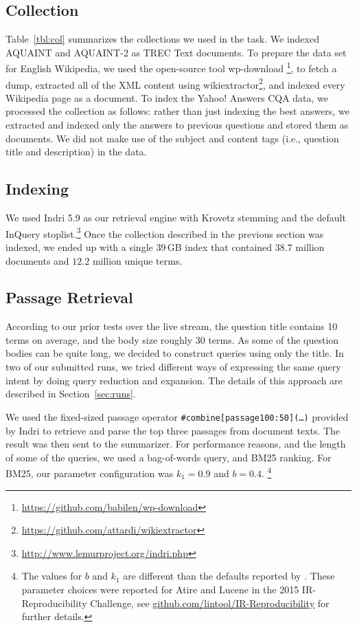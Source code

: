 \documentclass[a4paper,10pt,conference,compsocconf,final]{IEEEtran}
\newcommand\method[1]{{\sf\small{#1}}}
\newcommand\gb[1]{$#1$\,GB}
\begin{document}
{{{{\subsection{Collection}

Table~{\ref{tbl:col}} summarizes the collections we used in the task.  We
indexed AQUAINT and AQUAINT-2 as TREC Text documents.
To prepare the data set for English Wikipedia, we used the
open-source tool {\method{wp-download}}
\footnote{\url{https://github.com/babilen/wp-download}}, to fetch a
dump, extracted all of the XML content using
{\method{wikiextractor}}\footnote{\url{https://github.com/attardi/wikiextractor}},
and indexed every Wikipedia page as a document.
To index the Yahoo! Answers CQA data, we processed the collection as 
follows: rather than just indexing the best answers, we extracted and
indexed only the answers to previous questions and stored them as
documents.
We did not make use of the subject and content tags (i.e., question
title and description) in the data.

\subsection{Indexing}
We used Indri 5.9 as our retrieval engine with Krovetz stemming and
the default InQuery
stoplist.\footnote{\url{http://www.lemurproject.org/indri.php}}
Once the collection described in the previous section was indexed, we 
ended up with a single \gb{39} index that contained $38.7$
million documents and $12.2$ million unique terms.

\subsection{Passage Retrieval}
\label{sec:passage}

According to our prior tests over the live stream, the question title
contains 10 terms on average, and the body size roughly 30 terms.
As some of the question bodies can be quite long, we decided to 
construct queries using only the title.
In two of our submitted runs, we tried different ways of expressing
the same query intent by doing query reduction and expansion.
The details of this approach are described in Section~\ref{sec:runs}.

We used the fixed-sized passage operator
\texttt{\#combine[passage100:50](\ldots)} provided by Indri to
retrieve and parse the top three passages from document texts.
The result was then sent to the summarizer.
For performance reasons, and the length of some of the queries, we
used a bag-of-words query, and BM25 ranking.
For BM25, our parameter configuration was $k_1=0.9$ and $b=0.4$.
\footnote{The values for $b$ and $k_1$ are different than the
defaults reported by {\citet{rwj+94-trec}}.
These parameter choices were reported for Atire and Lucene in the
2015 IR-Reproducibility Challenge, see
{\url{github.com/lintool/IR-Reproducibility}} for further details.}

}}}}
\end{document}
